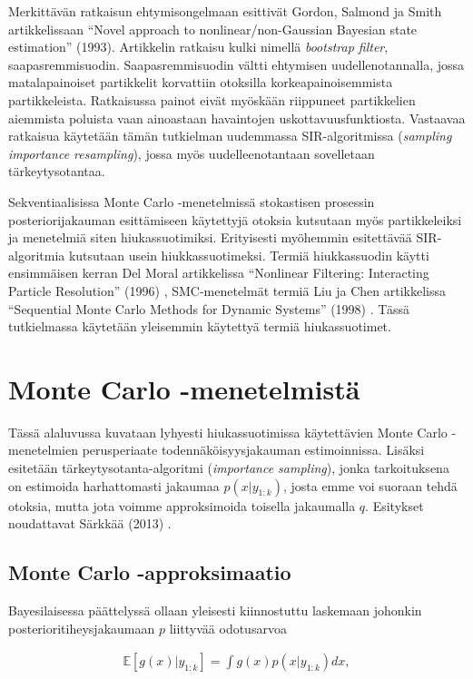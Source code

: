 \documentclass[
  12pt,
  a4paper, twoside]{book}
\begin{document}
Merkittävän ratkaisun ehtymisongelmaan esittivät Gordon, Salmond ja Smith artikkelissaan ``Novel approach to nonlinear/non-Gaussian Bayesian state estimation'' (1993). \citep{Gordon-1993} Artikkelin ratkaisu kulki nimellä \emph{bootstrap filter}, saapasremmisuodin. Saapasremmisuodin vältti ehtymisen uudellenotannalla, jossa matalapainoiset partikkelit korvattiin otoksilla korkeapainoisemmista partikkeleista. Ratkaisussa painot eivät myöskään riippuneet partikkelien aiemmista poluista vaan ainoastaan havaintojen uskottavuusfunktiosta. Vastaavaa ratkaisua käytetään tämän tutkielman uudemmassa SIR-algoritmissa (\emph{sampling importance resampling}), jossa myös uudelleenotantaan sovelletaan tärkeytysotantaa.

Sekventiaalisissa Monte Carlo -menetelmissä stokastisen prosessin posteriorijakauman esittämiseen käytettyjä otoksia kutsutaan myös partikkeleiksi ja menetelmiä siten hiukassuotimiksi. Erityisesti myöhemmin esitettävää SIR-algoritmia kutsutaan usein hiukkassuotimeksi. Termiä hiukkassuodin käytti ensimmäisen kerran Del Moral artikkelissa ``Nonlinear Filtering: Interacting Particle Resolution'' (1996) \citep{DelMoral-1996}, SMC-menetelmät termiä Liu ja Chen artikkelissa ``Sequential Monte Carlo Methods for Dynamic Systems'' (1998) \citep{Liu-1998}. Tässä tutkielmassa käytetään yleisemmin käytettyä termiä hiukassuotimet.

\section{Monte Carlo -menetelmistä}

Tässä alaluvussa kuvataan lyhyesti hiukassuotimissa käytettävien Monte Carlo -menetelmien perusperiaate todennäköisyysjakauman estimoinnissa. Lisäksi esitetään tärkeytysotanta-algoritmi (\emph{importance sampling}), jonka tarkoituksena on estimoida harhattomasti jakaumaa \(p(x|y_{1:k})\), josta emme voi suoraan tehdä otoksia, mutta jota voimme approksimoida toisella jakaumalla \(q\). Esitykset noudattavat Särkkää (2013) \citep{sarkka-2013}.

\subsection{Monte Carlo -approksimaatio}

Bayesilaisessa päättelyssä ollaan yleisesti kiinnostuttu laskemaan johonkin posterioritiheysjakaumaan \(p\) liittyvää odotusarvoa

\begin{align}
\mathbb{E}[g(x)|y_{1:k}]=\int g(x)p(x|y_{1:k})dx,
\end{align}
\end{document}
